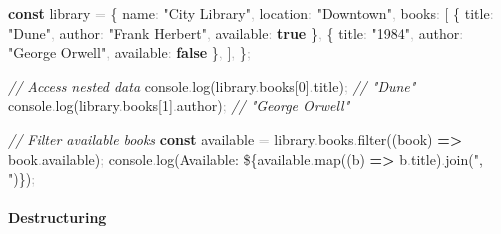 \documentclass[
  justified,
  openright,
]{tufte-book}
\let\subsection\paragraph
\let\paragraph\paragraph
\newcommand{\KeywordTok}[1]{\textcolor{CodeKeyword}{\textbf{#1}}}  %
\newcommand{\StringTok}[1]{\textcolor{CodeString}{#1}}              %
\newcommand{\CommentTok}[1]{\textcolor{CodeComment}{\textit{#1}}}  %
\newcommand{\CodeNumTok}[1]{\textcolor{CodeNumber}{#1}}             %
\newcommand{\CodeFuncTok}[1]{\textcolor{CodeKeyword}{#1}}           %
\newcommand{\CodeTypeTok}[1]{\textcolor{CodeType}{#1}}              %
\newcommand{\OperatorTok}[1]{\textcolor{DarkGray}{#1}}              %
\newenvironment{Shaded}{%
  \begin{mdframed}[style=TufteCode]%
}{%
  \end{mdframed}%
}
\let\subsection\paragraph
\let\paragraph\paragraph
\begin{document}
\begin{Shaded}
\begin{Highlighting}[]
\KeywordTok{const} library \OperatorTok{=} \{
  \CodeTypeTok{name}\OperatorTok{:} \StringTok{"City Library"}\OperatorTok{,}
  \CodeTypeTok{location}\OperatorTok{:} \StringTok{"Downtown"}\OperatorTok{,}
  \CodeTypeTok{books}\OperatorTok{:} [
    \{ \CodeTypeTok{title}\OperatorTok{:} \StringTok{"Dune"}\OperatorTok{,} \CodeTypeTok{author}\OperatorTok{:} \StringTok{"Frank Herbert"}\OperatorTok{,} \CodeTypeTok{available}\OperatorTok{:} \KeywordTok{true} \}\OperatorTok{,}
    \{ \CodeTypeTok{title}\OperatorTok{:} \StringTok{"1984"}\OperatorTok{,} \CodeTypeTok{author}\OperatorTok{:} \StringTok{"George Orwell"}\OperatorTok{,} \CodeTypeTok{available}\OperatorTok{:} \KeywordTok{false} \}\OperatorTok{,}
  ]\OperatorTok{,}
\}\OperatorTok{;}
 
\CommentTok{// Access nested data}
console\OperatorTok{.}\CodeFuncTok{log}(library\OperatorTok{.}\CodeTypeTok{books}[\CodeNumTok{0}]\OperatorTok{.}\CodeTypeTok{title})\OperatorTok{;} \CommentTok{// "Dune"}
console\OperatorTok{.}\CodeFuncTok{log}(library\OperatorTok{.}\CodeTypeTok{books}[\CodeNumTok{1}]\OperatorTok{.}\CodeTypeTok{author})\OperatorTok{;} \CommentTok{// "George Orwell"}
 
\CommentTok{// Filter available books}
\KeywordTok{const} available \OperatorTok{=} library\OperatorTok{.}\CodeTypeTok{books}\OperatorTok{.}\CodeFuncTok{filter}((book) \KeywordTok{=\textgreater{}} book\OperatorTok{.}\CodeTypeTok{available})\OperatorTok{;}
console\OperatorTok{.}\CodeFuncTok{log}(\StringTok{\textasciigrave{}Available: }\StringTok{\$\{}available\OperatorTok{.}\CodeFuncTok{map}((b) \KeywordTok{=\textgreater{}} b\OperatorTok{.}\CodeTypeTok{title})\OperatorTok{.}\CodeFuncTok{join}(\StringTok{", "})\StringTok{\}}\StringTok{\textasciigrave{}})\OperatorTok{;}
\end{Highlighting}
\end{Shaded}

\subsection{Destructuring}\label{destructuring}
\end{document}
